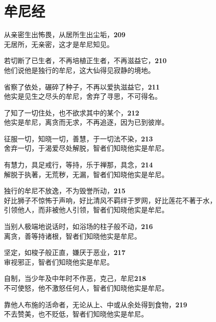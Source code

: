 \section{牟尼经}

从亲密生出怖畏，从居所生出尘垢，\hfill{\grayfootnotesize \textbf{209}} \\
无居所，无亲密，这才是牟尼知见。


若切断了已生者，不再培植正生者，不再滋益它，\hfill{\grayfootnotesize \textbf{210}} \\
他们说他是独行的牟尼，这大仙得见寂静的境地。


省察了依处，碾碎了种子，不再以爱执滋益它，\hfill{\grayfootnotesize \textbf{211}} \\
他实是见生之尽头的牟尼，舍弃了寻思，不可得名。


了知了一切住处，也不欲求其中的某个，\hfill{\grayfootnotesize \textbf{212}} \\
他实是牟尼，离贪而无求，不再追逐，因为已到彼岸。


征服一切，知晓一切，善慧，于一切法不染，\hfill{\grayfootnotesize \textbf{213}} \\
舍弃一切，于渴爱尽处解脱，智者们知晓他实是牟尼。


有慧力，具足戒行，等持，乐于禅那，具念，\hfill{\grayfootnotesize \textbf{214}} \\
解脱于执著，无荒秽，无漏，智者们知晓他实是牟尼。


独行的牟尼不放逸，不为毁誉所动，\hfill{\grayfootnotesize \textbf{215}} \\
好比狮子不惊怖于声响，好比清风不羁绊于罗网，好比莲花不著于水，\\
引领他人，而非被他人引领，智者们知晓他实是牟尼。


当别人极端地说话时，如浴场的柱子般不动，\hfill{\grayfootnotesize \textbf{216}} \\
离贪，善等持诸根，智者们知晓他实是牟尼。


坚定，如梭子般正直，嫌厌于恶业，\hfill{\grayfootnotesize \textbf{217}} \\
审视邪正，智者们知晓他实是牟尼。


自制，当少年及中年时不作恶，克己，牟尼\hfill{\grayfootnotesize \textbf{218}} \\
不可使怒，他不激怒任何人，智者们知晓他实是牟尼。


靠他人布施的活命者，无论从上、中或从余处得到食物，\hfill{\grayfootnotesize \textbf{219}} \\
不去赞美，也不贬低，智者们知晓他实是牟尼。


